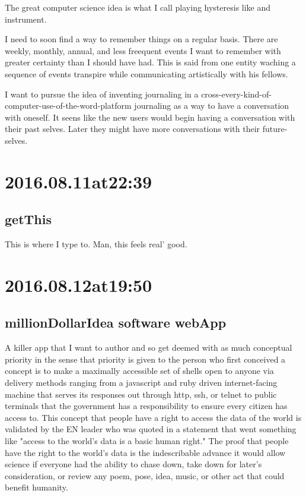\begin{enumerate}
\begin{enumerate}
The great computer science idea is what I call playing hysteresis like and instrument. 

I need to soon find a way to remember things on a regular basis. There are weekly, monthly, annual, and less freequent events I want to remember with greater certainty than I should have had. This is said from one entity waching a sequence of events transpire while communicating artistically with his fellows.

		I want to pursue the idea of inventing journaling in a cross-every-kind-of-computer-use-of-the-word-platform journaling as a way to have a conversation with oneself. It seens like the new users would begin having a conversation with their past selves. Later they might have more conversations with their future-selves.

\section*{ 2016.08.11at22:39 }
\subsection*{getThis}
This is where I type to. Man, this feels real' good. 

\section*{ 2016.08.12at19:50 }
\subsection*{millionDollarIdea software webApp}
A killer app that I want to author and so get deemed with as much conceptual priority in the sense that priority is given to the person who first conceived a concept is to make a maximally accessible set of shells open to anyone via delivery methods ranging from a javascript and ruby driven internet-facing machine that serves its responses out through http, ssh, or telnet to public terminals that the government has a responsibility to ensure every citizen has access to. This concept that people have a right to access the data of the world is validated by the EN leader who was quoted in a statement that went something like "access to the world's data is a basic human right." The proof that people have the right to the world's data is the indescribable advance it would allow science if everyone had the ability to chase down, take down for later's consideration, or review any poem, pose, idea, music, or other act that could benefit humanity. 


\end{enumerate}
\end{enumerate}
